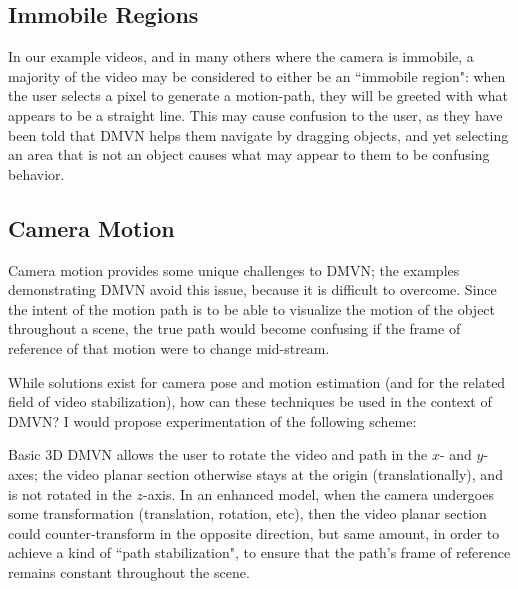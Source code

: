 \subsection{Immobile Regions}
In our example videos, and in many others where the camera is immobile, a majority of the video may be considered to either be an ``immobile region": when the user selects a pixel to generate a motion-path, they will be greeted with what appears to be a straight line. This may cause confusion to the user, as they have been told that DMVN helps them navigate by dragging objects, and yet selecting an area that is not an object causes what may appear to them to be confusing behavior.

\subsection{Camera Motion}
Camera motion provides some unique challenges to DMVN; the examples demonstrating DMVN avoid this issue, because it is difficult to overcome. Since the intent of the motion path is to be able to visualize the motion of the object throughout a scene, the true path would become confusing if the frame of reference of that motion were to change mid-stream.\par
    While solutions exist for camera pose and motion estimation (and for the related field of video stabilization), how can these techniques be used in the context of DMVN? I would propose experimentation of the following scheme:\par
    Basic 3D DMVN allows the user to rotate the video and path in the $x$- and $y$-axes; the video planar section otherwise stays at the origin (translationally), and is not rotated in the $z$-axis. In an enhanced model, when the camera undergoes some transformation (translation, rotation, etc), then the video planar section could counter-transform in the opposite direction, but same amount, in order to achieve a kind of ``path stabilization", to ensure that the path's frame of reference remains constant throughout the scene.


